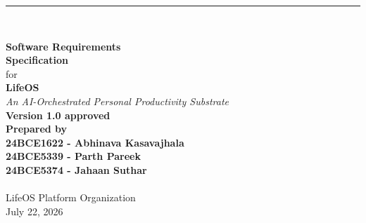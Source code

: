 \documentclass[11pt,a4paper]{article}
\begin{document}
\begin{titlepage}
    \thispagestyle{empty}
    
    \noindent\rule{\linewidth}{2.5pt} \\[1.8cm]
    
    \begin{flushright}
        {\fontsize{32pt}{38pt}\selectfont\bfseries Software Requirements\\[0.2cm] Specification} \\[1.2cm]
        
        {\fontsize{20pt}{24pt}\selectfont for} \\[1.2cm]
        
        {\fontsize{32pt}{36pt}\selectfont\bfseries LifeOS} \\[0.3cm]
        {\fontsize{15pt}{19pt}\selectfont\itshape An AI-Orchestrated Personal Productivity Substrate} \\[1.2cm]
        
        {\fontsize{15pt}{19pt}\selectfont\bfseries Version 1.0 approved} \\[1.2cm]
        
        {\fontsize{14pt}{18pt}\selectfont\bfseries Prepared by \\
        24BCE1622 - Abhinava Kasavajhala\\ 
        24BCE5339 - Parth Pareek \\
        24BCE5374 - Jahaan Suthar \\ 
        } \\[0.6cm]
        
        {\fontsize{14pt}{18pt}\selectfont LifeOS Platform Organization} \\[0.5cm]
        
        {\fontsize{14pt}{18pt}\selectfont July 22, 2026}
    \end{flushright}
    
    \vfill
    
\end{titlepage}

\newpage
{}
\setcounter{page}{2}

 \\[0.5cm]
\end{document}
